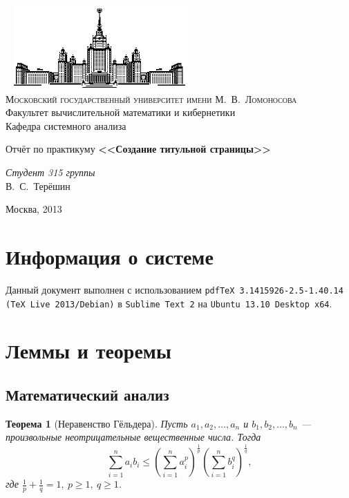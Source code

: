 \documentclass[11pt]{article}
\newtheorem{theorem}{Теорема}
\begin{document}
\thispagestyle{empty}

\begin{center}
\ \vspace{-3cm} \newline
\includegraphics[width=0.5\textwidth]{msu.eps}\\
{\scshape Московский государственный университет имени М.~В.~Ломоносова}\\
Факультет вычислительной математики и кибернетики\\
Кафедра системного анализа

\vfill
{\LARGE Отчёт по практикуму} \newline
{\Huge\bfseries <<Создание титульной страницы>>}
\end{center}

\vspace{1cm}
\begin{flushright}
\large
\textit{Студент 315 группы}\\
В.~С.~Терёшин\\
\end{flushright}

\vfill
\begin{center}
Москва, 2013
\end{center}

\pagebreak
\section{Информация о системе}
Данный документ выполнен с использованием \texttt{pdfTeX 3.1415926-2.5-1.40.14 (TeX Live 2013/Debian)}
в \texttt{Sublime Text 2} на \texttt{Ubuntu 13.10 Desktop x64}.

\section{Леммы и теоремы}

\subsection{Математический анализ}
\begin{theorem}[Неравенство Гёльдера]
Пусть $a_1,a_2,\ldots,a_n$ и $b_1,b_2,\ldots,b_n$ --- произвольные неотрицательные вещественные числа. Тогда
$$ \sum\limits_{i=1}^{n}a_i b_i \leqslant
\left( \sum\limits_{i=1}^{n} a_i^p \right)^{\frac{1}{p}}
\left( \sum\limits_{i=1}^{n} b_i^q \right)^{\frac{1}{q}} ,$$
где $\frac{1}{p}+\frac{1}{q}=1, \ p \geqslant 1, \ q \geqslant 1$.
\end{theorem}
\end{document}
